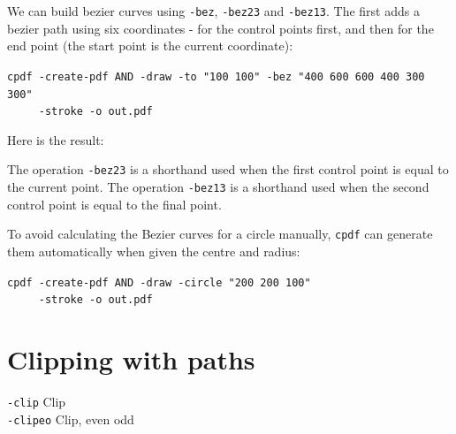 \documentclass{book}
\begin{document}
\noindent We can build bezier curves using \texttt{-bez}, \texttt{-bez23} and \texttt{-bez13}. The first adds a bezier path using six coordinates - for the control points first, and then for the end point (the start point is the current coordinate):

\begin{framed}
 \noindent\small\verb?cpdf -create-pdf AND -draw -to "100 100" -bez "400 600 600 400 300 300"?\\
 \noindent\small\verb?     -stroke -o out.pdf?
\end{framed}

\noindent Here is the result:

\bigskip
{}
\bigskip

\noindent The operation \texttt{-bez23} is a shorthand used when the first control point is equal to the current point. The operation \texttt{-bez13} is a shorthand used when the second control point is equal to the final point.

To avoid calculating the Bezier curves for a circle manually, \texttt{cpdf} can generate them automatically when given the centre and radius:

\begin{framed}
 \noindent\small\verb?cpdf -create-pdf AND -draw -circle "200 200 100"?\\
 \noindent\small\verb?     -stroke -o out.pdf?
\end{framed}

\section{Clipping with paths}
  {\small\begin{framed}
   \noindent\verb!-clip! Clip\\
   \noindent\verb!-clipeo! Clip, even odd
  \end{framed}}
\end{document}
